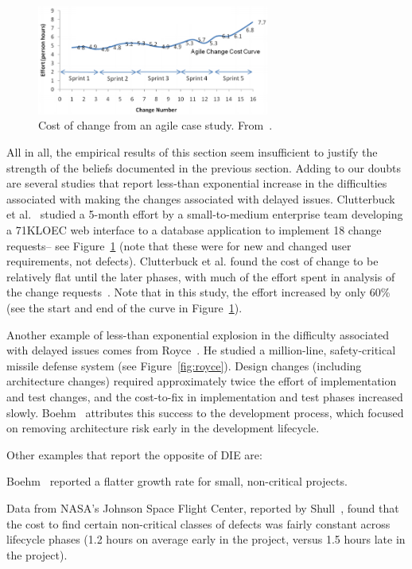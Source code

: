 \begin{figure}[!t]
 \includegraphics[width=3in]{img/clutterbuck.png} 
 \caption{Cost of change from an agile case study. From~\cite{Clutterbuck09}.}\label{fig:clutterbuck}
 \end{figure}

 
 
 All in all, the empirical results of this section seem insufficient to justify
 the strength of the beliefs documented in the previous section. Adding to our doubts are  several studies that report less-than exponential
 increase in the difficulties associated with making the changes associated with delayed
 issues. 
Clutterbuck et al.~\cite{Clutterbuck09} studied a 5-month effort by a small-to-medium enterprise team developing a 71KLOEC web interface to a database application to implement 18 change requests-- see Figure~\ref{fig:clutterbuck} (note that these were for new and changed user requirements, not defects). Clutterbuck et al. found the cost of change to be relatively flat until the later phases, with much of the effort spent in analysis of the change requests~\cite{Clutterbuck09}. Note that in this study, the effort increased by only 60\% (see the start and end of the curve in Figure~\ref{fig:clutterbuck}).




 
Another example of less-than exponential explosion in the difficulty associated with delayed issues comes from  Royce~\cite{Royce98}. He
studied  a million-line, safety-critical missile defense system
(see  Figure~\ref{fig:royce}). Design changes (including architecture changes) required approximately twice the effort of implementation and test changes, and the cost-to-fix in implementation and test phases increased slowly. Boehm~\cite{Boehm10} attributes this success to the  development process, which focused on removing architecture risk early in the development lifecycle.
 
 Other examples that report the opposite of DIE are:
  \bi
  \item
  Boehm~\cite{Boehm80} reported a flatter growth rate for small, non-critical projects.
   \item 
  Data from NASA's Johnson Space Flight Center, reported by Shull~\cite{Shull02}, found that the cost to find certain non-critical classes of defects was fairly constant across lifecycle phases (1.2 hours on average early in the project, versus 1.5 hours late in the project). 
   
